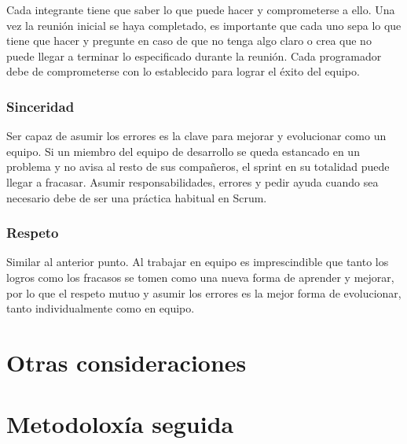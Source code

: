 Cada integrante tiene que saber lo que puede hacer y comprometerse a ello. Una vez la reunión inicial se haya completado, es importante que cada uno sepa lo que tiene que hacer y pregunte en caso de que no tenga algo claro o crea que no puede llegar a terminar lo especificado durante la reunión. Cada programador debe de comprometerse con lo establecido para lograr el éxito del equipo.

\subsubsection{Sinceridad}

Ser capaz de asumir los errores es la clave para mejorar y evolucionar como un equipo. Si un miembro del equipo de desarrollo se queda estancado en un problema y no avisa al resto de sus compañeros, el sprint en su totalidad puede llegar a fracasar. Asumir responsabilidades, errores y pedir ayuda cuando sea necesario debe de ser una práctica habitual en Scrum.

\subsubsection{Respeto}

Similar al anterior punto. Al trabajar en equipo es imprescindible que tanto los logros como los fracasos se tomen como una nueva forma de aprender y mejorar, por lo que el respeto mutuo y asumir los errores es la mejor forma de evolucionar, tanto individualmente como en equipo.

\section{Otras consideraciones}

\section{Metodoloxía seguida}